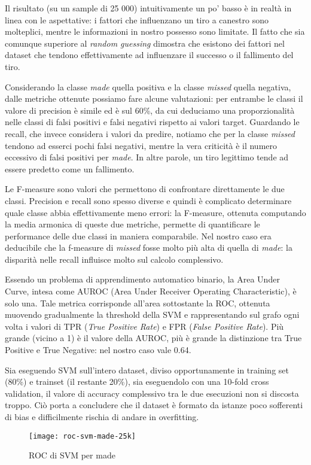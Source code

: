 Il risultato (su un sample di 25 000) intuitivamente un po' basso è in realtà in linea con le aspettative: i fattori che influenzano un tiro a canestro sono molteplici, mentre le informazioni in nostro possesso sono limitate. Il fatto che sia comunque superiore al \textit{random guessing} dimostra che esistono dei fattori nel dataset che tendono effettivamente ad influenzare il successo o il fallimento del tiro.

\par
Considerando la classe \textit{made} quella positiva e la classe \textit{missed} quella negativa, dalle metriche ottenute possiamo fare alcune valutazioni: per entrambe le classi il valore di precision è simile ed è sul 60\%, da cui deduciamo una proporzionalità nelle classi di falsi positivi e falsi negativi rispetto ai valori target.
Guardando le recall, che invece considera i valori da predire, notiamo che per la classe \textit{missed} tendono ad esserci pochi falsi negativi, mentre la vera criticità è il numero eccessivo di falsi positivi per \textit{made}. In altre parole, un tiro legittimo tende ad essere predetto come un fallimento.

Le F-measure sono valori che permettono di confrontare direttamente le due classi. Precision e recall sono spesso diverse e quindi è complicato determinare quale classe abbia effettivamente meno errori: la F-measure, ottenuta computando la media armonica di queste due metriche, permette di quantificare le performance delle due classi in maniera comparabile. Nel nostro caso era deducibile che la f-measure di \textit{missed} fosse molto più alta di quella di \textit{made}: la disparità nelle recall influisce molto sul calcolo complessivo.

Essendo un problema di apprendimento automatico binario, la Area Under Curve, intesa come AUROC (Area Under Receiver Operating Characteristic), è solo una. Tale metrica corrisponde all'area sottostante la ROC, ottenuta muovendo gradualmente la threshold della SVM e rappresentando sul grafo ogni volta i valori di TPR (\textit{True Positive Rate}) e FPR (\textit{False Positive Rate}).
Più grande (vicino a 1) è il valore della AUROC, più è grande la distinzione tra True Positive e True Negative: nel nostro caso vale 0.64.

\par
Sia eseguendo SVM sull'intero dataset, diviso opportunamente in training set (80\%) e trainset (il restante 20\%), sia eseguendolo con una 10-fold cross validation, il valore di accuracy complessivo tra le due esecuzioni non si discosta troppo. Ciò porta a concludere che il dataset è formato da istanze poco sofferenti di bias e difficilmente rischia di andare in overfitting.
\begin{figure}[H]
\centering
\caption{ROC di SVM per made}
\label{roc svm}
  \texttt{[image: roc-svm-made-25k]}
\end{figure}
\pagebreak
